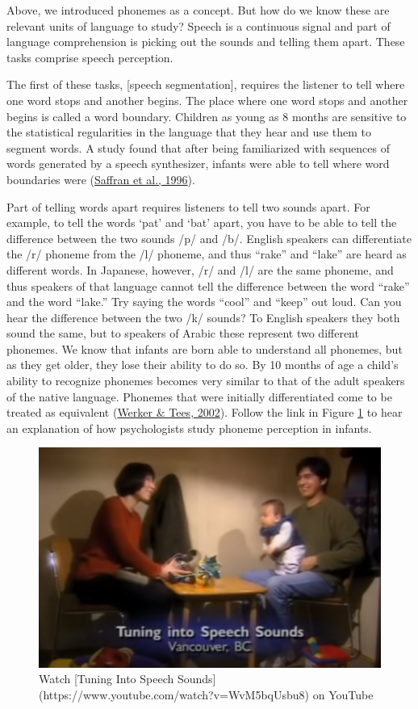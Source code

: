 \documentclass[
]{krantz}
\begin{document}
Above, we introduced phonemes as a concept. But how do we know these are relevant units of language to study? Speech is a continuous signal and part of language comprehension is picking out the sounds and telling them apart. These tasks comprise speech perception.

The first of these tasks, {[}speech segmentation{]}, requires the listener to tell where one word stops and another begins. The place where one word stops and another begins is called a word boundary. Children as young as 8 months are sensitive to the statistical regularities in the language that they hear and use them to segment words. A study found that after being familiarized with sequences of words generated by a speech synthesizer, infants were able to tell where word boundaries were (\protect\hyperlink{ref-saffran1996}{Saffran et al., 1996}).

Part of telling words apart requires listeners to tell two sounds apart. For example, to tell the words `pat' and `bat' apart, you have to be able to tell the difference between the two sounds /p/ and /b/. English speakers can differentiate the /r/ phoneme from the /l/ phoneme, and thus ``rake'' and ``lake'' are heard as different words. In Japanese, however, /r/ and /l/ are the same phoneme, and thus speakers of that language cannot tell the difference between the word ``rake'' and the word ``lake.'' Try saying the words ``cool'' and ``keep'' out loud. Can you hear the difference between the two /k/ sounds? To English speakers they both sound the same, but to speakers of Arabic these represent two different phonemes. We know that infants are born able to understand all phonemes, but as they get older, they lose their ability to do so. By 10 months of age a child's ability to recognize phonemes becomes very similar to that of the adult speakers of the native language. Phonemes that were initially differentiated come to be treated as equivalent (\protect\hyperlink{ref-Werker2002}{Werker \& Tees, 2002}). Follow the link in Figure \ref{fig:speechsounds} to hear an explanation of how psychologists study phoneme perception in infants.

\begin{figure}

{\centering \includegraphics[width=0.5\linewidth]{images/ch8/tuning_into_speech_sounds} 

}

\caption{Watch [Tuning Into Speech Sounds](https://www.youtube.com/watch?v=WvM5bqUsbu8) on YouTube}\label{fig:speechsounds}
\end{figure}
\end{document}
